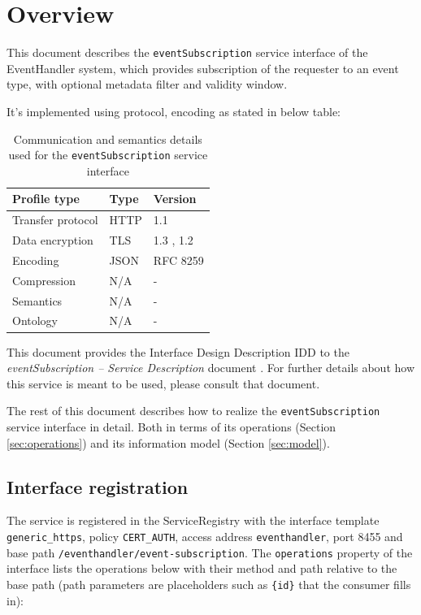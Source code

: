 \documentclass[a4paper]{arrowhead}
\begin{document}
\section{Overview}
\label{sec:overview}

This document describes the \texttt{eventSubscription} service interface of the EventHandler system, which provides subscription of the requester to an event type, with optional metadata filter and validity window.

It's implemented using protocol, encoding as stated in below table:
\begin{table}[ht!]
  \centering
  \begin{tabular}{|l|l|l|}
    \hline
    \rowcolor{gray!33} Profile type & Type & Version \\ \hline
    Transfer protocol & HTTP & 1.1 \cite{rfc9112} \\ \hline
    Data encryption & TLS & 1.3 \cite{rfc8446}, 1.2 \cite{rfc5246} \\ \hline
    Encoding & JSON & RFC 8259 \cite{rfc8259} \\ \hline
    Compression & N/A & - \\ \hline
    Semantics & N/A & - \\ \hline
    Ontology & N/A & - \\ \hline
  \end{tabular}
  \caption{Communication and semantics details used for the \texttt{eventSubscription} service interface}
  \label{tab:comunication_semantics_profile}
\end{table}

This document provides the Interface Design Description IDD to the \textit{eventSubscription -- Service Description} document \cite{eh-eventSubscription-sd}.
For further details about how this service is meant to be used, please consult that document.

The rest of this document describes how to realize the \texttt{eventSubscription} service
interface in detail. Both in terms of its operations (Section \ref{sec:operations}) and its information model (Section \ref{sec:model}).

\subsection{Interface registration}

The service is registered in the ServiceRegistry with the interface template \texttt{generic\_\allowbreak{}https}, policy \texttt{CERT\_\allowbreak{}AUTH}, access address \texttt{eventhandler}, port 8455 and base path \texttt{/\allowbreak{}eventhandler/\allowbreak{}event-\allowbreak{}subscription}. The \texttt{operations} property of the interface lists the operations below with their method and path relative to the base path (path parameters are placeholders such as \texttt{\{id\}} that the consumer fills in):
\end{document}
